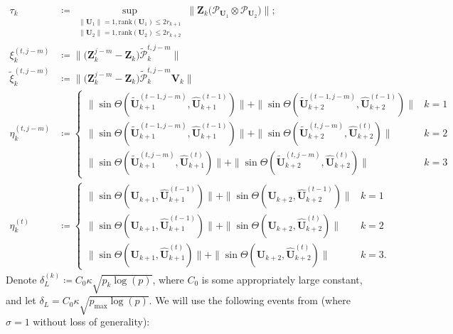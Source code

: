 \documentclass[10pt]{article}
\newcommand{\0}{{\mathbf{0}}}
\newcommand{\1}{{\mathbf{1}}}
\newcommand{\U}{{\mathbf{U}}}
\renewcommand{\citet}{\cite}
\newcommand{\utilde}{\mathbf{\tilde{U}}}
\newcommand{\uhat}{\mathbf{\hat{U}}}
\renewcommand{\tilde}{\widetilde}
\renewcommand{\hat}{\widehat}
\renewcommand{\hat}{\widehat}
\begin{document}
 \begin{align*}
    \tau_k &\coloneqq\sup_{\substack{ \| \mathbf{U}_1 \| = 1, \mathrm{rank}(\U_1) \leq 2 r_{k+1}\\ \|\mathbf{U}_2\| =1, \mathrm{rank}(\U_2) \leq 2 r_{k+2}} } \|  \mathbf{Z}_k \bigg( \mathcal{P}_{\mathbf{U}_1} \otimes \mathcal{P}_{\mathbf{U}_2} \bigg)\|; \\  
    \xi_{k}^{(t,j-m)} &\coloneqq 
    \bigg\| \bigg(\mathbf{Z}_k^{j-m} - \mathbf{Z}_k \bigg) \mathcal{\tilde P}_{k}^{t,j-m}  \bigg\| \\
    \tilde \xi_{k}^{(t,j-m)} &\coloneqq   \bigg\| \bigg(\mathbf{Z}_k^{j-m} - \mathbf{Z}_k \bigg) \mathcal{\tilde P}_{k}^{t,j-m}  \mathbf{V}_k  \bigg\| \\
     \eta_{k}^{(t,j-m)} &\coloneqq 
     \begin{cases}
         \| \sin\Theta( \utilde_{k+1}^{(t-1,j-m)}, \uhat_{k+1}^{(t-1)}) \| + \| \sin\Theta( \utilde_{k+2}^{(t-1,j-m)}, \uhat_{k+2}^{(t-1)}) \| & k = 1  \\
          \| \sin\Theta( \utilde_{k+1}^{(t-1,j-m)}, \uhat_{k+1}^{(t-1)}) \| + \| \sin\Theta( \utilde_{k+2}^{(t,j-m)}, \uhat_{k+2}^{(t)}) \| & k = 2  \\
           \| \sin\Theta( \utilde_{k+1}^{(t,j-m)}, \uhat_{k+1}^{(t)}) \| + \| \sin\Theta( \utilde_{k+2}^{(t,j-m)}, \uhat_{k+2}^{(t)}) \| & k = 3  \end{cases} \\
    \eta_k^{(t)} &\coloneqq \begin{cases}\| \sin\Theta( \U_{k+1}, \uhat_{k+1}^{(t-1)}) \| + \| \sin\Theta( \U_{k+2}, \uhat_{k+2}^{(t-1)}) \| & k = 1 \\
        \| \sin\Theta( \U_{k+1}, \uhat_{k+1}^{(t-1)}) \| + \| \sin\Theta( \U_{k+2}, \uhat_{k+2}^{(t)}) \| & k = 2 \\
        \| \sin\Theta( \U_{k+1}, \uhat_{k+1}^{(t)}) \| + \| \sin\Theta( \U_{k+2}, \uhat_{k+2}^{(t)}) \| & k = 3.
    \end{cases}
\end{align*}
Denote $\delta_L^{(k)} \coloneqq C_0\kappa \sqrt{p_k \log(p)}$, where $C_0$ is some appropriately large constant, and let $\delta_L = C_0 \kappa \sqrt{p_{\max} \log(p)}$.  We will use the following events from \citet{agterberg_estimating_2022} (where $\sigma = 1$ without loss of generality):
\end{document}
